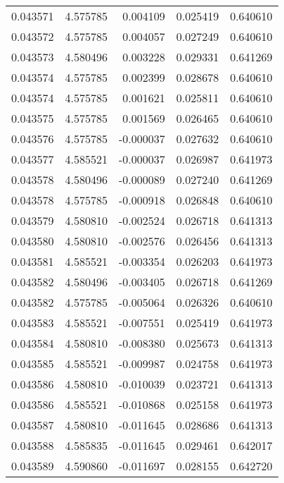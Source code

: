 \begin{tabular}{lrrrr}
0.043571    &  4.575785 &  0.004109 &  0.025419 &             0.640610 \\
0.043572    &  4.575785 &  0.004057 &  0.027249 &             0.640610 \\
0.043573    &  4.580496 &  0.003228 &  0.029331 &             0.641269 \\
0.043574    &  4.575785 &  0.002399 &  0.028678 &             0.640610 \\
0.043574    &  4.575785 &  0.001621 &  0.025811 &             0.640610 \\
0.043575    &  4.575785 &  0.001569 &  0.026465 &             0.640610 \\
0.043576    &  4.575785 & -0.000037 &  0.027632 &             0.640610 \\
0.043577    &  4.585521 & -0.000037 &  0.026987 &             0.641973 \\
0.043578    &  4.580496 & -0.000089 &  0.027240 &             0.641269 \\
0.043578    &  4.575785 & -0.000918 &  0.026848 &             0.640610 \\
0.043579    &  4.580810 & -0.002524 &  0.026718 &             0.641313 \\
0.043580    &  4.580810 & -0.002576 &  0.026456 &             0.641313 \\
0.043581    &  4.585521 & -0.003354 &  0.026203 &             0.641973 \\
0.043582    &  4.580496 & -0.003405 &  0.026718 &             0.641269 \\
0.043582    &  4.575785 & -0.005064 &  0.026326 &             0.640610 \\
0.043583    &  4.585521 & -0.007551 &  0.025419 &             0.641973 \\
0.043584    &  4.580810 & -0.008380 &  0.025673 &             0.641313 \\
0.043585    &  4.585521 & -0.009987 &  0.024758 &             0.641973 \\
0.043586    &  4.580810 & -0.010039 &  0.023721 &             0.641313 \\
0.043586    &  4.585521 & -0.010868 &  0.025158 &             0.641973 \\
0.043587    &  4.580810 & -0.011645 &  0.028686 &             0.641313 \\
0.043588    &  4.585835 & -0.011645 &  0.029461 &             0.642017 \\
0.043589    &  4.590860 & -0.011697 &  0.028155 &             0.642720 \\

\end{tabular}
